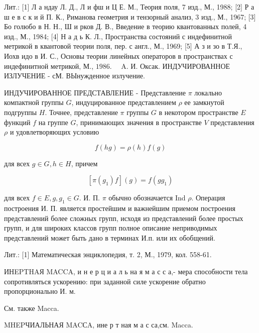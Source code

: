 \documentclass[10pt]{article}
\begin{document}
Лит.: [1] Л а ндау Л. Д., Л и фш и Ц Е. М., Теория поля, 7 изд., М., 1988; [2] Р а ш е в с к и й П. К., Риманова геометрия и тензорный анализ, 3 изд., М., 1967; [3] Бо голюбо в Н. Н., Ш и рков Д. В., Введение в теорию квантованных полей, 4 изд., М., 1984; [4] Н а д ь К. Л., Пространства состояний с индефинитной метрикой в квантовой теории поля, пер. с англ., М., 1969; [5] А з и зо в Т.Я., Иохв идо в И. С., Основы теории линейных операторов в пространствах с индефинитной метрикой, М., $1986 . \quad$ A. И. Оксак. ИНДУЧИРОВАННОЕ ИЗЛУЧЕНИЕ - сМ. ВЫнужденное излучение.



ИНДУЧИРОВАННОЕ ПРЕДСТАВЛЕНИЕ - Представление $\pi$ локально компактной группы $G$, индуцированное представлением $\rho$ ее замкнутой подгруппы $H$. Точнее, представление $\pi$ группы $G$ в некотором пространстве $E$ функций $f$ на группе $G$, принимающих значения в пространстве $V$ представления $\rho$ и удовлетворяющих условию



\[

f(h g)=\rho(h) f(g)

\]



для всех $g \in G, h \in H$, причем



\[

\left[\pi\left(g_{1}\right) f\right](g)=f\left(g g_{1}\right)

\]



для всех $f \in E, g, g_{1} \in G$. И. П. $\pi$ обычно обозначается Ind $\rho$. Операция построения И. П. является простейшим и важнейшим приемом построения представлений более сложных групп, исходя из представлений более простых групп, и для широких классов групп полное описание неприводимых представлений может быть дано в терминах И.п. или их обобщений.



Лит.: [1] Математическая энциклопедия, т. 2, М., 1979, кол. 558-61.



ИНEPTHAЯ MACCA, и н е р ц и а л ь на я м а с с а,- мера способности тела сопротивляться ускорению: при заданной силе ускорение обратно пропорционально И. м.



См. также Macca.



MHEPЧИАЛЬНАЯ MACСA, ине р т ная м а с са,см. Macca.
\end{document}
